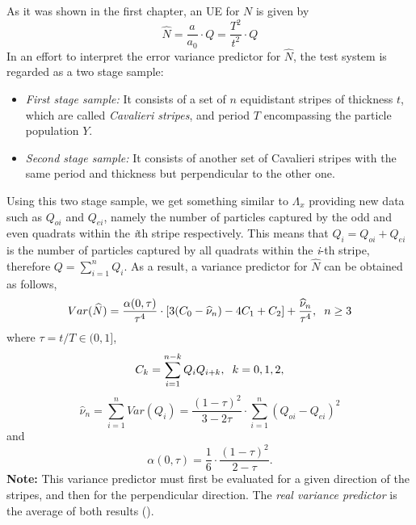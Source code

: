 As it was shown in the first chapter, an UE for $N$ is given by
\begin{equation*}
    \widehat{N} = \frac{a}{a_0} \cdot Q = \frac{T^2}{t^2} \cdot Q
\end{equation*}
In an effort to interpret the error variance predictor for $\widehat{N}$, the test system is regarded as a two stage sample:
\begin{itemize}
    \item \textit{First stage sample:} It consists of a set of $n$ equidistant
    stripes of thickness $t$, which are called \emph{Cavalieri stripes}, and period $T$ encompassing the particle population $Y$.
    \item \textit{Second stage sample:} It consists of another set of Cavalieri stripes with the same period and thickness but perpendicular to the other one.
\end{itemize}
Using this two stage sample, we get something similar to $\Lambda_x$ providing new data such as $Q_{oi}$ and $Q_{ei}$, namely the number of particles captured by the odd and even quadrats within the \textit{i}th stripe respectively. This means that $Q_i=Q_{oi}+Q_{ei}$ is the number of particles captured by all quadrats within the \textit{i}-th stripe, therefore $Q=\sum_{i=1}^n Q_i$. As a result, a variance predictor for $\widehat{N}$ can be obtained as follows,%
\begin{equation*}
    Var(\widehat{N}) = \frac{\alpha(0,\tau)}{\tau^4}\cdot [3(C_0-\widehat{\nu}_n) - 4C_1 + C_2] + \frac{\widehat{\nu}_n}{\tau^4}, \hspace{2mm} n\geq 3
\end{equation*}
where $\tau = t/T \in (0,1]$,
\begin{equation*}
    C_k = \sum_{i=1}^{n-k}Q_i Q_{i+k}, \hspace{2mm} k=0,1,2,
\end{equation*}
\begin{equation*}
    \widehat{\nu}_n = \sum_{i=1}^n Var(Q_i) = \frac{(1-\tau)^2}{3-2\tau} \cdot \sum_{i=1}^n (Q_{oi}-Q_{ei})^2
\end{equation*}
and
\begin{equation*}
    \alpha(0,\tau) = \frac{1}{6}\cdot \frac{(1-\tau)^2}{2-\tau}.
\end{equation*}
\textbf{Note:} This variance predictor must first be evaluated for a given direction of the stripes, and then for the perpendicular direction. The \textit{real variance predictor} is the average of both results (\cite{SterThAppl-2022-07-21.pdf}).




